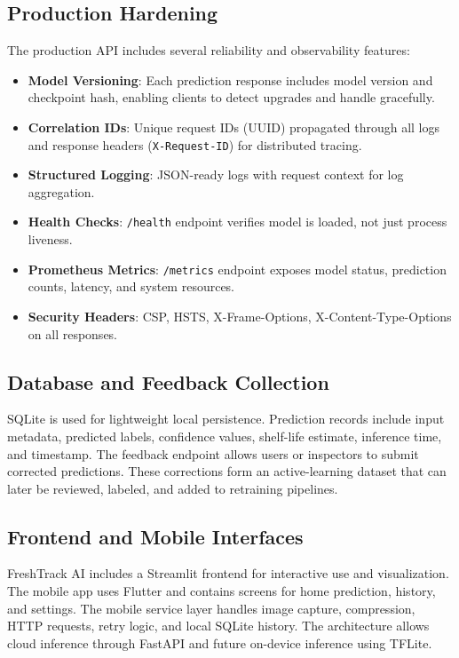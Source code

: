 \documentclass[conference]{IEEEtran}
\begin{document}
\subsection{Production Hardening}
The production API includes several reliability and observability features:
\begin{itemize}
    \item \textbf{Model Versioning}: Each prediction response includes model version and checkpoint hash, enabling clients to detect upgrades and handle gracefully.
    \item \textbf{Correlation IDs}: Unique request IDs (UUID) propagated through all logs and response headers (\texttt{X-Request-ID}) for distributed tracing.
    \item \textbf{Structured Logging}: JSON-ready logs with request context for log aggregation.
    \item \textbf{Health Checks}: \texttt{/health} endpoint verifies model is loaded, not just process liveness.
    \item \textbf{Prometheus Metrics}: \texttt{/metrics} endpoint exposes model status, prediction counts, latency, and system resources.
    \item \textbf{Security Headers}: CSP, HSTS, X-Frame-Options, X-Content-Type-Options on all responses.
\end{itemize}

\subsection{Database and Feedback Collection}
SQLite is used for lightweight local persistence. Prediction records include input metadata, predicted labels, confidence values, shelf-life estimate, inference time, and timestamp. The feedback endpoint allows users or inspectors to submit corrected predictions. These corrections form an active-learning dataset that can later be reviewed, labeled, and added to retraining pipelines.

\subsection{Frontend and Mobile Interfaces}
FreshTrack AI includes a Streamlit frontend for interactive use and visualization. The mobile app uses Flutter and contains screens for home prediction, history, and settings. The mobile service layer handles image capture, compression, HTTP requests, retry logic, and local SQLite history. The architecture allows cloud inference through FastAPI and future on-device inference using TFLite.
\end{document}
